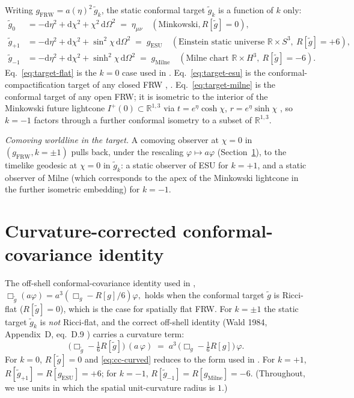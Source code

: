 \documentclass[11pt]{article}
\theoremstyle{definition}
\newcommand{\R}{\mathbb{R}}
\newcommand{\FRW}{\mathrm{FRW}}
\newcommand{\ESU}{\mathrm{ESU}}
\newcommand{\Milne}{\mathrm{Milne}}
\begin{document}
Writing $g_\FRW=a(\eta)^2\,\tilde g_k$, the static conformal target
$\tilde g_k$ is a function of $k$ only:
\begin{align}
\tilde g_0 &= -\mathrm{d}\eta^2 + \mathrm{d}\chi^2 + \chi^2\,\mathrm{d}\Omega^2
            \;=\; \eta_{\mu\nu}\quad (\text{Minkowski}, R[\tilde g]=0),
            \label{eq:target-flat}\\
\tilde g_{+1}
            &= -\mathrm{d}\eta^2 + \mathrm{d}\chi^2 + \sin^2\chi\,\mathrm{d}\Omega^2
            \;=\; g_\ESU\quad
            (\text{Einstein static universe } \R\times S^3,\ R[\tilde g]=+6),
            \label{eq:target-esu}\\
\tilde g_{-1}
            &= -\mathrm{d}\eta^2 + \mathrm{d}\chi^2 + \sinh^2\chi\,\mathrm{d}\Omega^2
            \;=\; g_\Milne\quad
            (\text{Milne chart } \R\times H^3,\ R[\tilde g]=-6).
            \label{eq:target-milne}
\end{align}
Eq.~\eqref{eq:target-flat} is the $k=0$ case used in \cite{Remondiere2026}.
Eq.~\eqref{eq:target-esu} is the conformal-compactification target of any
closed FRW \cite[\S5.4]{Wald1994}, \cite[Ch.~9]{PenroseRindler1986}.
Eq.~\eqref{eq:target-milne} is the conformal target of any open FRW; it is
isometric to the interior of the Minkowski future lightcone $I^+(0)\subset
\R^{1,3}$ via $t=e^\eta\cosh\chi$, $r=e^\eta\sinh\chi$
\cite[\S5.3]{Wald1994}, so $k=-1$ factors through a further conformal
isometry to a subset of $\R^{1,3}$.

\smallskip

\noindent\emph{Comoving worldline in the target.} A comoving observer at
$\chi=0$ in $(g_\FRW,k=\pm 1)$ pulls back, under the rescaling
$\varphi\mapsto a\varphi$ (Section~\ref{sec:cc-cov}), to the timelike
geodesic at $\chi=0$ in $\tilde g_k$: a static observer of ESU for $k=+1$,
and a static observer of Milne (which corresponds to the apex of the
Minkowski lightcone in the further isometric embedding) for $k=-1$.

\section{Curvature-corrected conformal-covariance identity}\label{sec:cc-cov}

The off-shell conformal-covariance identity used in \cite[eq.~(5)]{Remondiere2026},
\(
\Box_{\tilde g}(a\varphi) = a^3(\Box_g-R[g]/6)\varphi,
\)
holds when the conformal target $\tilde g$ is Ricci-flat ($R[\tilde g]=0$),
which is the case for spatially flat FRW. For $k=\pm 1$ the static target
$\tilde g_k$ is \emph{not} Ricci-flat, and the correct off-shell identity
(Wald 1984, Appendix~D, eq.~D.9 \cite{Wald1984}) carries a curvature term:
\begin{equation}\label{eq:cc-curved}
\big(\Box_{\tilde g} - \tfrac{1}{6}R[\tilde g]\big)\,(a\,\varphi)
\;=\; a^3\,\big(\Box_g - \tfrac{1}{6}R[g]\big)\,\varphi.
\end{equation}
For $k=0$, $R[\tilde g]=0$ and \eqref{eq:cc-curved} reduces to the form used
in \cite{Remondiere2026}. For $k=+1$, $R[\tilde g_{+1}]=R[g_\ESU]=+6$; for
$k=-1$, $R[\tilde g_{-1}]=R[g_\Milne]=-6$. (Throughout, we use units in
which the spatial unit-curvature radius is $1$.)
\end{document}
